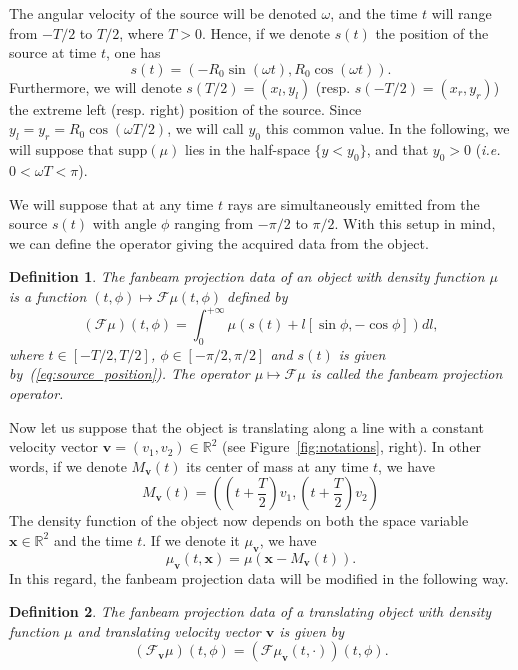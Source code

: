 \documentclass[9pt,technote]{IEEEtran}
\numberwithin{equation}{section}
\newcommand{\R}{\mathbb{R}}
\newcommand{\ie}{\emph{i.e.} }
\newcommand{\supp}{\textrm{supp}}
\newcommand{\bx}{\mathbf{x}}
\newcommand{\bv}{\mathbf{v}}
\newcommand{\Mbv}{M_{\mathbf{v}}}
\newcommand{\Tbv}{\mathcal{F}_{\mathbf{v}}}
\newcommand{\mubv}{\mu_{\mathbf{v}}}
\newtheorem{definition}{Definition}
\begin{document}
The angular velocity of the source will be denoted $\omega$, and the time $t$ will range from $-T/2$ to $T/2$, where $T>0$. Hence, if we denote $s(t)$ the position of the source at time $t$, one has
\begin{equation}
	s(t) = \left( -R_0 \sin(\omega t), R_0 \cos(\omega t) \right).
\label{eq:source_position}
\end{equation}
Furthermore, we will denote $s(T/2)=(x_l,y_l)$ (resp. $s(-T/2)=(x_r,y_r)$) the extreme left (resp. right) position of the source. Since $y_l = y_r = R_0 \cos(\omega T/2)$, we will call $y_0$ this common value. In the following, we will suppose that $\supp(\mu)$ lies in the half-space $\{ y < y_0 \}$, and that $y_0 > 0$ (\ie $0 < \omega T < \pi$).

We will suppose that at any time $t$ rays are simultaneously emitted from the source $s(t)$ with angle $\phi$ ranging from $-\pi/2$ to $\pi/2$. With this setup in mind, we can define the operator giving the acquired data from the object.
\begin{definition}
The \emph{fanbeam projection data} of an object with density function $\mu$ is a function $(t,\phi) \mapsto \mathcal{F}\mu(t,\phi)$ defined by
\begin{equation}
	(\mathcal{F}\mu)(t,\phi) = \int_0^{+\infty} \mu \left( s(t) + l \left[ \sin \phi, -\cos \phi \right] \right) dl,
\end{equation}
where $t \in \left[ -T/2, T/2\right]$, $\phi \in \left[ -\pi/2, \pi/2\right]$ and $s(t)$ is given by~(\ref{eq:source_position}). The operator $\mu \mapsto \mathcal{F}\mu$ is called the \emph{fanbeam projection operator}.
\end{definition}


Now let us suppose that the object is translating along a line with a constant velocity vector $\bv = (v_1, v_2)\in \R^2$ (see Figure~\ref{fig:notations}, right). In other words, if we denote $\Mbv(t)$ its center of mass at any time $t$, we have
\begin{equation}
	\Mbv(t) =  \left( \left( t + \frac{T}{2} \right)v_1, \left( t + \frac{T}{2} \right)v_2 \right)
\label{eq:center_of_mass}
\end{equation}
The density function of the object now depends on both the space variable $\bx \in \R^2$ and the time $t$. If we denote it $\mubv$, we have
\begin{equation}
	\mubv(t,\bx) = \mu\left( \bx - \Mbv(t)\right).
\end{equation}
In this regard, the fanbeam projection data will be modified in the following way.
\begin{definition}
The \emph{fanbeam projection data of a translating object} with density function $\mu$ and translating velocity vector $\bv$ is given by
\begin{equation}
	(\Tbv\mu)(t,\phi) = \left( \mathcal{F} \mubv(t,\cdot) \right)(t,\phi).
\label{eq:def_Tv}
\end{equation}
\end{definition}
\end{document}
